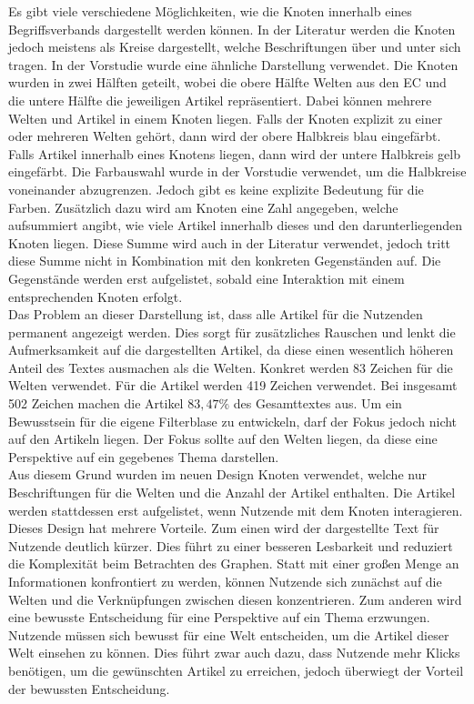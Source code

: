 Es gibt viele verschiedene Möglichkeiten, wie die Knoten innerhalb eines Begriffsverbands dargestellt werden können.
In der Literatur werden die Knoten jedoch meistens als Kreise dargestellt, welche Beschriftungen über und unter sich tragen.
In der Vorstudie wurde eine ähnliche Darstellung verwendet.
Die Knoten wurden in zwei Hälften geteilt, wobei die obere Hälfte Welten aus den \ac{EC} und die untere Hälfte die jeweiligen Artikel repräsentiert.
Dabei können mehrere Welten und Artikel in einem Knoten liegen.
Falls der Knoten explizit zu einer oder mehreren Welten gehört, dann wird der obere Halbkreis blau eingefärbt.
Falls Artikel innerhalb eines Knotens liegen, dann wird der untere Halbkreis gelb eingefärbt.
Die Farbauswahl wurde in der Vorstudie verwendet, um die Halbkreise voneinander abzugrenzen.
Jedoch gibt es keine explizite Bedeutung für die Farben.
Zusätzlich dazu wird am Knoten eine Zahl angegeben, welche aufsummiert angibt, wie viele Artikel innerhalb dieses und den darunterliegenden Knoten liegen.
Diese Summe wird auch in der Literatur verwendet, jedoch tritt diese Summe nicht in Kombination mit den konkreten Gegenständen auf.
Die Gegenstände werden erst aufgelistet, sobald eine Interaktion mit einem entsprechenden Knoten erfolgt. \\

Das Problem an dieser Darstellung ist, dass alle Artikel für die Nutzenden permanent angezeigt werden.
Dies sorgt für zusätzliches Rauschen und lenkt die Aufmerksamkeit auf die dargestellten Artikel, da diese einen wesentlich höheren Anteil des Textes ausmachen als die Welten.
Konkret werden 83 Zeichen für die Welten verwendet.
Für die Artikel werden 419 Zeichen verwendet.
Bei insgesamt 502 Zeichen machen die Artikel $83,47\%$ des Gesamttextes aus.
Um ein Bewusstsein für die eigene Filterblase zu entwickeln, darf der Fokus jedoch nicht auf den Artikeln liegen.
Der Fokus sollte auf den Welten liegen, da diese eine Perspektive auf ein gegebenes Thema darstellen.\\

Aus diesem Grund wurden im neuen Design Knoten verwendet, welche nur Beschriftungen für die Welten und die Anzahl der Artikel enthalten.
Die Artikel werden stattdessen erst aufgelistet, wenn Nutzende mit dem Knoten interagieren.
Dieses Design hat mehrere Vorteile.
Zum einen wird der dargestellte Text für Nutzende deutlich kürzer.
Dies führt zu einer besseren Lesbarkeit und reduziert die Komplexität beim Betrachten des Graphen.
Statt mit einer großen Menge an Informationen konfrontiert zu werden, können Nutzende sich zunächst auf die Welten und die Verknüpfungen zwischen diesen konzentrieren.
Zum anderen wird eine bewusste Entscheidung für eine Perspektive auf ein Thema erzwungen.
Nutzende müssen sich bewusst für eine Welt entscheiden, um die Artikel dieser Welt einsehen zu können.
Dies führt zwar auch dazu, dass Nutzende mehr Klicks benötigen, um die gewünschten Artikel zu erreichen, jedoch überwiegt der Vorteil der bewussten Entscheidung.\\

